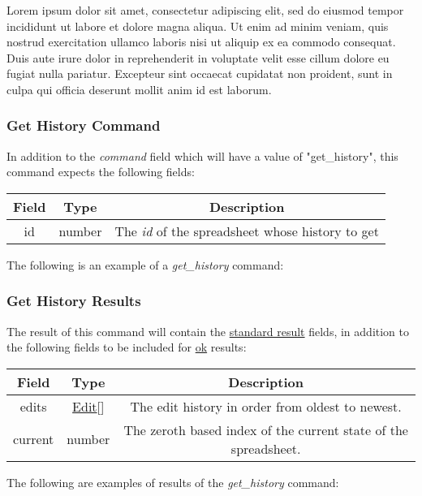 Lorem ipsum dolor sit amet, consectetur adipiscing elit, sed do eiusmod tempor incididunt ut labore et dolore magna aliqua. Ut enim ad minim veniam, quis nostrud exercitation ullamco laboris nisi ut aliquip ex ea commodo consequat. Duis aute irure dolor in reprehenderit in voluptate velit esse cillum dolore eu fugiat nulla pariatur. Excepteur sint occaecat cupidatat non proident, sunt in culpa qui officia deserunt mollit anim id est laborum.

\subsubsection{Get History Command}
In addition to the \emph{command} field which will have a value of "get\_history", this command expects the following fields:
\begin{table}[H]
    \begin{center}
        \begin{tabular}{|c|c|c|}\hline
            Field & Type & Description \\\hline
            id & number & The \emph{id} of the spreadsheet whose history to get \\\hline
        \end{tabular}
    \end{center}
\end{table}

The following is an example of a \emph{get\_history} command:


\subsubsection{Get History Results}
The result of this command will contain the \hyperref[sec:message:result]{standard result} fields, in addition to the following fields to be included for \underline{ok} results:
\begin{table}[H]
    \begin{center}
        \begin{tabular}{|c|c|c|}\hline
            Field & Type & Description \\\hline
            edits & \hyperref[sec:message:edits]{Edit}[] & The edit history in order from oldest to newest. \\\hline
            current & number & The zeroth based index of the current state of the spreadsheet. \\\hline
        \end{tabular}
    \end{center}
\end{table}

The following are examples of results of the \emph{get\_history} command:




